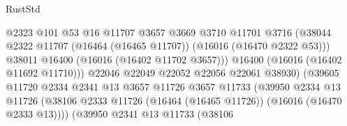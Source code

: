 \begin{lexlean}{RustStd}
\begin{coremodule}
                                              @2323
                                              @101
                                              @53
                                              @16
                                              @11707
                                              @3657
                                              @3669
                                              @3710
                                              @11701
                                              @3716
                                              (@38044
                                                @2322
                                                @11707
                                                (@16464 (@16465 @11707))
                                                (@16016 (@16470 @2322 @53)))
                                              @38011
                                              @16400
                                              (@16016 (@16402 @11702 @3657)))
                                            @16400
                                            (@16016 (@16402 @11692 @11710)))
                                          @22046
                                          @22049
                                          @22052
                                          @22056
                                          @22061
                                          @38930)
                                        (@39605
                                          @11720
                                          @2334
                                          @2341
                                          @13
                                          @3657
                                          @11726
                                          @3657
                                          @11733
                                          (@39950
                                            @2334
                                            @13
                                            @11726
                                            (@38106
                                              @2333
                                              @11726
                                              (@16464 (@16465 @11726))
                                              (@16016 (@16470 @2333 @13))))
                                          (@39950
                                            @2341
                                            @13
                                            @11733
                                            (@38106

\end{coremodule}
\end{lexlean}
